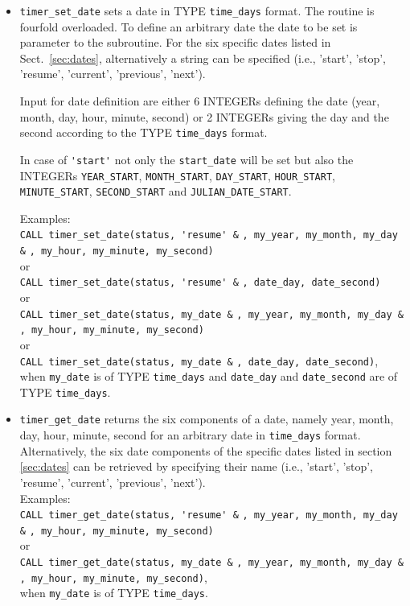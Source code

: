 \documentclass[twoside]{article}
\begin{document}
\begin{itemize}
\item \verb|timer_set_date| sets a date in {\footnotesize TYPE} \verb|time_days|
       format.
       The routine is fourfold overloaded. To define an arbitrary date the date
       to be set is parameter to the subroutine. For the six specific dates
      listed in Sect.~\ref{sec:dates}, alternatively a string can be specified
      (i.e., 'start', 'stop', 'resume', 'current', 'previous', 'next').
      
      Input for date definition are either 6 {\footnotesize INTEGER}s defining
      the
      date (year, month, day, hour, minute, second) or 2 
      {\footnotesize INTEGER}s giving the
      day and the second according to the {\footnotesize TYPE} \verb|time_days|
      format.

      In case of \verb|'start'| not only the \verb|start_date|
      will be set but also the {\footnotesize INTEGER}s \verb|YEAR_START|,
      \verb|MONTH_START|, \verb|DAY_START|, \verb|HOUR_START|,
      \verb|MINUTE_START|, \verb|SECOND_START| and \verb|JULIAN_DATE_START|.

      Examples:\\
      \verb|CALL timer_set_date(status, 'resume' &|
      \verb|, my_year, my_month, my_day &|
      \verb|, my_hour, my_minute, my_second)| \\ or \\
      \verb|CALL timer_set_date(status, 'resume' &|
      \verb|, date_day, date_second)| \\ or \\
      \verb|CALL timer_set_date(status, my_date &|
      \verb|, my_year, my_month, my_day &|
      \verb|, my_hour, my_minute, my_second)| \\ or \\
      \verb|CALL timer_set_date(status, my_date &|
      \verb|, date_day, date_second)|, \\ when \verb|my_date| is of
      {\footnotesize TYPE} \verb|time_days| and \verb|date_day| and 
      \verb|date_second| are of 
      {\footnotesize TYPE} \verb|time_days|.
 
\item \verb|timer_get_date| returns the six components of a date, namely year,
      month, day, hour, minute, second for an arbitrary date in
      \verb|time_days| format.  Alternatively, the six date components of the
      specific dates listed in section \ref{sec:dates} can be retrieved by
      specifying their name (i.e., 'start', 'stop', 'resume', 'current',
      'previous', 'next').  
      \\Examples: \\
      \verb|CALL timer_get_date(status, 'resume' &|
      \verb|, my_year, my_month, my_day &|
      \verb|, my_hour, my_minute, my_second)| \\ or \\
      \verb|CALL timer_get_date(status, my_date &|
      \verb|, my_year, my_month, my_day &|
      \verb|, my_hour, my_minute, my_second)|, \\ when \verb|my_date| is of
      {\footnotesize TYPE} \verb|time_days|.


\end{itemize}
\end{document}
